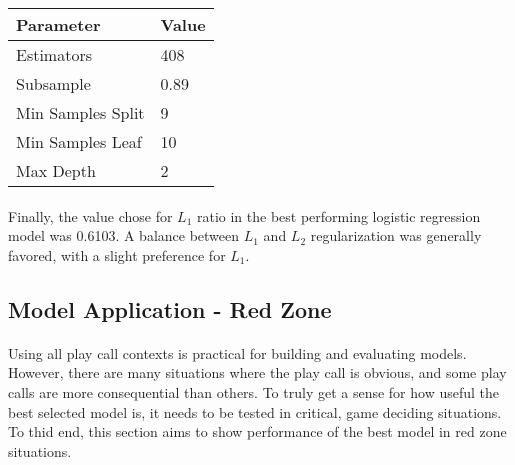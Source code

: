 \documentclass[11pt]{article}
\begin{document}
\begin{multicols*}{2}
        \begin{center}
            \begin{tabular}{|| m{3.25cm} | m{3cm}||}
                \hline
                \textbf{Parameter} & \textbf{Value}  \\
                \hline\hline
                Estimators & 408  \\
                \hline
                Subsample & 0.89 \\
                \hline
                Min Samples Split & 9 \\
                \hline
                Min Samples Leaf & 10 \\
                \hline
                Max Depth & 2 \\
                \hline
                
            \end{tabular}
            \end{center}


            \paragraph{}
                Finally, the value chose for $L_1$ ratio in the best performing logistic regression model was 0.6103. 
                A balance between $L_1$ and $L_2$ regularization was generally favored, with a slight preference for $L_1$. 

                    
        \subsection{Model Application - Red Zone}
            \paragraph{}
                Using all play call contexts is practical for building and evaluating models. 
                However, there are many situations where the play call is obvious, and some play calls are more consequential than others.
                To truly get a sense for how useful the best selected model is, it needs to be tested in critical, game deciding situations. 
                To thid end, this section aims to show performance of the best model in red zone situations. 
            
            \vspace{-10pt}


\end{multicols*}
\end{document}
